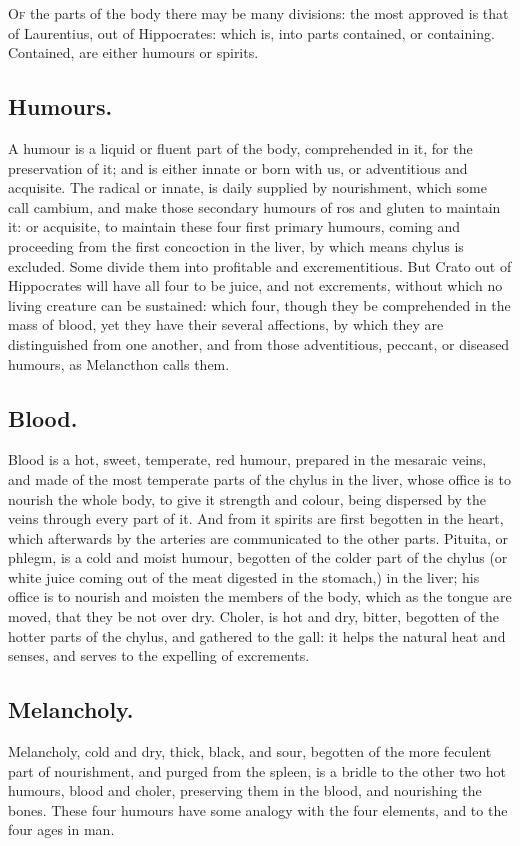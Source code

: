 {\lettrine{O}{f} the parts of the body there may be many divisions: the most approved
is that of Laurentius, out of Hippocrates: which is, into parts
contained, or containing. Contained, are either humours or spirits.
\subsection{Humours.}
A humour is a liquid or fluent part of the body,
comprehended in it, for the preservation of it; and is either innate or
born with us, or adventitious and acquisite. The radical or innate, is
daily supplied by nourishment, which some call cambium, and make those
secondary humours of ros and gluten to maintain it: or acquisite, to
maintain these four first primary humours, coming and proceeding from
the first concoction in the liver, by which means chylus is excluded.
Some divide them into profitable and excrementitious. But Crato
out of Hippocrates will have all four to be juice, and not excrements,
without which no living creature can be sustained: which four, though
they be comprehended in the mass of blood, yet they have their several
affections, by which they are distinguished from one another, and from
those adventitious, peccant, or diseased humours, as Melancthon
calls them.
\subsection{Blood.}
Blood is a hot, sweet, temperate, red humour, prepared in the
mesaraic veins, and made of the most temperate parts of the chylus in
the liver, whose office is to nourish the whole body, to give it
strength and colour, being dispersed by the veins through every part of
it. And from it spirits are first begotten in the heart, which
afterwards by the arteries are communicated to the other parts.
Pituita, or phlegm, is a cold and moist humour, begotten of the colder
part of the chylus (or white juice coming out of the meat digested in
the stomach,) in the liver; his office is to nourish and moisten the
members of the body, which as the tongue are moved, that they be not
over dry.
Choler, is hot and dry, bitter, begotten of the hotter parts of the
chylus, and gathered to the gall: it helps the natural heat and senses,
and serves to the expelling of excrements.
\subsection{Melancholy.}
Melancholy, cold and dry, thick, black, and sour,
begotten of the more feculent part of nourishment, and purged from the
spleen, is a bridle to the other two hot humours, blood and choler,
preserving them in the blood, and nourishing the bones. These four
humours have some analogy with the four elements, and to the four ages
in man.
}
